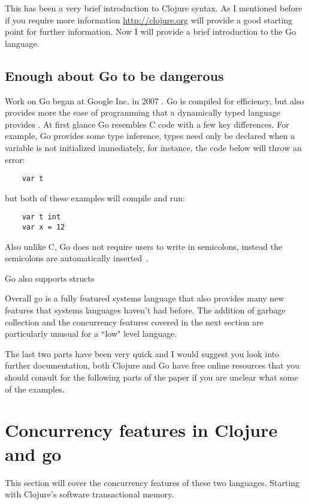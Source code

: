 \documentclass{acm_proc_article-sp}
\begin{document}
	This has been a very brief introduction to Clojure syntax. As I mentioned before if you require more information \url{http://clojure.org} will provide a good starting point for further information. Now I will provide a brief introduction to the Go language.
	
	\subsection{Enough about Go to be dangerous}
	Work on Go began at Google Inc. in 2007 \cite{wiki:go}. Go is compiled for efficiency, but also provides more the ease of programming that a dynamically typed language provides \cite{wiki:go}. At first glance Go resembles C code with a few key differences. For example, Go provides some type inference, types need only be declared when a variable is not initialized immediately, for instance, the code below will throw an error:
	
	\begin{verbatim}
	var t
	\end{verbatim}
	
	but both of these examples will compile and run:
	
	\begin{verbatim}
	var t int
	var x = 12
	\end{verbatim}
	Also unlike C, Go does not require users to write in semicolons, instead the semicolons are automatically inserted~\cite{go:effective}.
	
	Go also supports structs
	
	Overall go is a fully featured systems language that also provides many new features that systems languages haven't had before. The addition of garbage collection and the concurrency features covered in the next section are particularly unusual for a ``low" level language.
	
	The last two parts have been very quick and I would suggest you look into further documentation, both Clojure and Go have free online resources that you should consult for the following parts of the paper if you are unclear what some of the examples.
	
	\section{Concurrency features in Clojure and go}
	This section will cover the concurrency features of these two languages. Starting with Clojure's software transactional memory.
	
\end{document}
